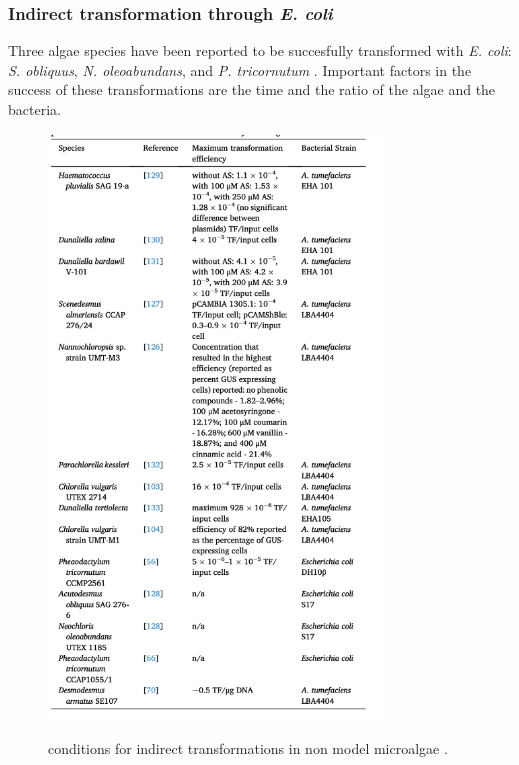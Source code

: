 \subsubsection{Indirect transformation through \textit{E. coli}}
Three algae species have been reported to be succesfully transformed with \textit{E. coli}: \textit{S. obliquus}, \textit{N. oleoabundans}, and \textit{P. tricornutum} \parencite{Mosey2021} \parencite{Sharma2018} \parencite{George2020} \parencite{Beratto-Ramos2018} \parencite{Karas2015}. Important factors in the success of these transformations are the time and the ratio of the algae and the bacteria.


\begin{figure}[!htbp]
    \centering
    \includegraphics[width=0.8\textwidth]{images/chap3/algae/image1.png}
    \label{fig:ch3algae01}
    \caption{conditions for indirect transformations in non model microalgae \parencite{Mosey2021}.} 
\end{figure}
\FloatBarrier



